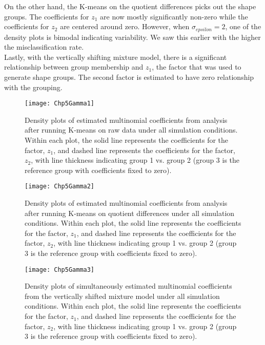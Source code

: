 On the other hand, the K-means on the quotient differences picks out the shape groups. The coefficients for $z_{1}$ are now mostly significantly non-zero while the coefficients for $z_{2}$ are centered around zero. However, when $\sigma_{epsilon}=2$, one of the density plots is bimodal indicating variability. We saw this earlier with the higher the misclassification rate.\\

Lastly, with the vertically shifting mixture model, there is a significant relationship between group membership and $z_{1}$, the factor that was used to generate shape groups. The second factor is estimated to have zero relationship with the grouping.

\begin{figure}[h]
\begin{center}
\texttt{[image: Chp5Gamma1]}
\end{center}
\label{fig:gamma1}
\caption{Density plots of estimated multinomial coefficients from analysis after running K-means on raw data under all simulation conditions. Within each plot, the solid line represents the coefficients for the factor, $z_{1}$, and dashed line represents the coefficients for the factor, $z_{2}$, with line thickness indicating group 1 vs. group 2 (group 3 is the reference group with coefficients fixed to zero).}
\end{figure}
\begin{figure}[h]
\begin{center}
\texttt{[image: Chp5Gamma2]}
\end{center}
\label{fig:gamma1}
\caption{Density plots of estimated multinomial coefficients from analysis after running K-means on quotient differences under all simulation conditions. Within each plot, the solid line represents the coefficients for the factor, $z_{1}$, and dashed line represents the coefficients for the factor, $z_{2}$, with line thickness indicating group 1 vs. group 2 (group 3 is the reference group with coefficients fixed to zero).}
\end{figure}
\begin{figure}[h]
\begin{center}
\texttt{[image: Chp5Gamma3]}
\end{center}
\label{fig:gamma1}
\caption{Density plots of simultaneously estimated multinomial coefficients from the vertically shifted mixture model under all simulation conditions. Within each plot, the solid line represents the coefficients for the factor, $z_{1}$, and dashed line represents the coefficients for the factor, $z_{2}$, with line thickness indicating group 1 vs. group 2 (group 3 is the reference group with coefficients fixed to zero).}
\end{figure}


